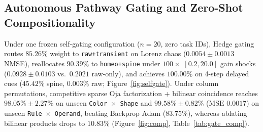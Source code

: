 \documentclass[11pt,a4paper]{article}
\begin{document}
\begin{table}[htbp]
\centering
\caption{GPU Throughput, Algebraic Parity, and $95\%$ Sparse Ternary Ablation ($n=20$, RTX 3060).}
\label{tab:gpu}
\small
{}
\end{table}

\subsection{Autonomous Pathway Gating and Zero-Shot Compositionality}
Under one frozen self-gating configuration ($n=20$, zero task IDs), Hedge gating routes $85.26\%$ weight to \texttt{raw+transient} on Lorenz chaos ($0.0054 \pm 0.0013$ NMSE), reallocates $90.39\%$ to \texttt{homeo+spine} under $100\times$ $[0.2, 20.0]$ gain shocks ($0.0928 \pm 0.0103$ vs.\ $0.2021$ raw-only), and achieves $100.00\%$ on 4-step delayed cues ($45.42\%$ spine, $0.003\%$ raw; Figure~\ref{fig:selfgate}). Under column permutations, competitive sparse Oja factorization + bilinear coincidence reaches \textbf{$98.05\% \pm 2.27\%$} on unseen \texttt{Color $\times$ Shape} and \textbf{$99.58\% \pm 0.82\%$} ($\text{MSE } 0.0017$) on unseen \texttt{Rule $\times$ Operand}, beating Backprop Adam ($83.75\%$), whereas ablating bilinear products drops to $10.83\%$ (Figure~\ref{fig:comp}, Table~\ref{tab:gate_comp}).
\end{document}
